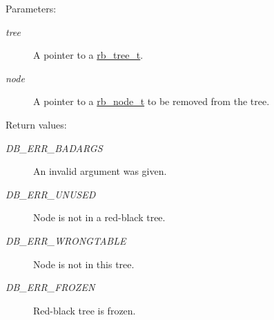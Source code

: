 \begin{Desc}
\item[Parameters:]
\begin{description}
\item[{\em tree}]A pointer to a \hyperlink{group__dbprim__rbtree_a0}{rb\_\-tree\_\-t}. \item[{\em node}]A pointer to a \hyperlink{group__dbprim__rbtree_a1}{rb\_\-node\_\-t} to be removed from the tree.\end{description}
\end{Desc}
\begin{Desc}
\item[Return values:]
\begin{description}
\item[{\em DB\_\-ERR\_\-BADARGS}]An invalid argument was given. \item[{\em DB\_\-ERR\_\-UNUSED}]Node is not in a red-black tree. \item[{\em DB\_\-ERR\_\-WRONGTABLE}]Node is not in this tree. \item[{\em DB\_\-ERR\_\-FROZEN}]Red-black tree is frozen. \end{description}
\end{Desc}
